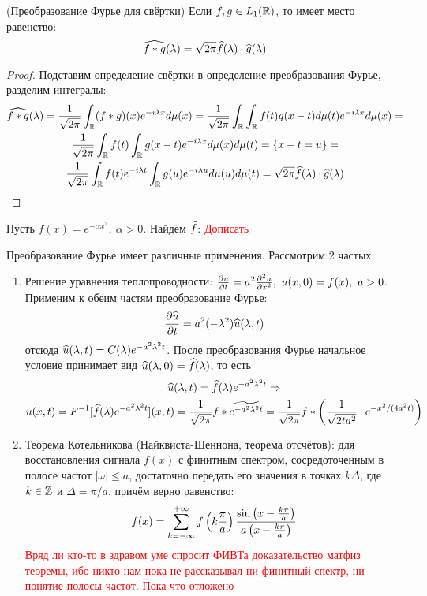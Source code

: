 \begin{theorem} (Преобразование Фурье для свёртки)
	Если $f, g \in L_1(\mathbb{R})$, то имеет место равенство:
	\[
		\widehat{f * g}(\lambda) = \sqrt{2\pi}\widehat{f}(\lambda) \cdot \widehat{g}(\lambda)
	\]
\end{theorem}

\begin{proof}
	Подставим определение свёртки в определение преобразования Фурье, разделим интегралы:
	\begin{multline*}
		\widehat{f * g}(\lambda) = \frac{1}{\sqrt{2\pi}} \int_{\mathbb{R}} (f * g)(x)e^{-i\lambda x}d\mu(x) = \frac{1}{\sqrt{2\pi}} \int_{\mathbb{R}} \int_{\mathbb{R}} f(t)g(x - t)d\mu(t)e^{-i\lambda x}d\mu(x) =
		\\
		\frac{1}{\sqrt{2\pi}} \int_{\mathbb{R}} f(t) \int_{\mathbb{R}} g(x - t)e^{-i\lambda x}d\mu(x)d\mu(t) = \{x - t = u\} =
		\\
		\frac{1}{\sqrt{2\pi}} \int_{\mathbb{R}} f(t)e^{-i\lambda t} \int_{\mathbb{R}} g(u)e^{-i\lambda u}d\mu(u)d\mu(t) = \sqrt{2\pi}\widehat{f}(\lambda) \cdot \widehat{g}(\lambda)
	\end{multline*}
\end{proof}

\begin{example}
	Пусть $f(x) = e^{-\alpha x^2},\ \alpha > 0$. Найдём $\widehat{f}$:
	\textcolor{red}{Дописать}
\end{example}

\begin{note}
	Преобразование Фурье имеет различные применения. Рассмотрим 2 частых:
	\begin{enumerate}
		\item Решение уравнения теплопроводности: $\frac{\partial u}{\partial t} = a^2 \frac{\partial ^2u}{\partial x^2},\ u(x, 0) = f(x),\ a > 0$. Применим к обеим частям преобразование Фурье:
		\[
			\frac{\partial \widehat{u}}{\partial t} = a^2 (-\lambda^2) \widehat{u}(\lambda, t)
		\]
		отсюда $\widehat{u}(\lambda, t) = C(\lambda) e^{-a^2\lambda^2 t}$. После преобразования Фурье начальное условие принимает вид $\widehat{u}(\lambda, 0) = \widehat{f}(\lambda)$, то есть
		\begin{multline*}
			\widehat{u}(\lambda, t) = \widehat{f}(\lambda) e^{-a^2\lambda^2 t} \Rightarrow
			\\
			u(x, t) = F^{-1}[\widehat{f}(\lambda) e^{-a^2\lambda^2 t}](x, t) = \frac{1}{\sqrt{2\pi}} f * \widetilde{e^{-a^2\lambda^2 t}} = \frac{1}{\sqrt{2\pi}} f * \left(\frac{1}{\sqrt{2ta^2}} \cdot e^{-x^2 / (4a^2 t)}\right)
		\end{multline*}
		
		\item Теорема Котельникова (Найквиста-Шеннона, теорема отсчётов): для восстановления сигнала $f(x)$ с финитным спектром, сосредоточенным в полосе частот $|\omega| \le a$, достаточно передать его значения в точках $k\Delta$, где $k \in \mathbb{Z}$ и $\Delta = \pi / a$, причём верно равенство:
		\[
			f(x) = \sum_{k = -\infty}^{+\infty} f\left(k\frac{\pi}{a}\right) \frac{\sin\left(x - \frac{k\pi}{a}\right)}{a\left(x - \frac{k\pi}{a}\right)}
		\]
		\textcolor{red}{Вряд ли кто-то в здравом уме спросит ФИВТа доказательство матфиз теоремы, ибо никто нам пока не рассказывал ни финитный спектр, ни понятие полосы частот. Пока что отложено}
	\end{enumerate}
\end{note}

